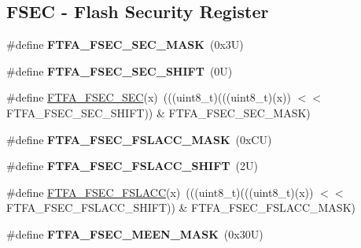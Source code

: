 \subsection*{F\+S\+EC -\/ Flash Security Register}
\begin{DoxyCompactItemize}
\item 
\mbox{\label{group___f_t_f_a___register___masks_ga3f0ba5e4a511479878b0505bc098ec00}} 
\#define {\bfseries F\+T\+F\+A\+\_\+\+F\+S\+E\+C\+\_\+\+S\+E\+C\+\_\+\+M\+A\+SK}~(0x3\+U)
\item 
\mbox{\label{group___f_t_f_a___register___masks_ga0c7032c13efe05ed6c6d86c42beb7a5f}} 
\#define {\bfseries F\+T\+F\+A\+\_\+\+F\+S\+E\+C\+\_\+\+S\+E\+C\+\_\+\+S\+H\+I\+FT}~(0\+U)
\item 
\#define \mbox{\hyperlink{group___f_t_f_a___register___masks_gacb0f50c64228c78ff70896ffa68ec797}{F\+T\+F\+A\+\_\+\+F\+S\+E\+C\+\_\+\+S\+EC}}(x)~(((uint8\+\_\+t)(((uint8\+\_\+t)(x)) $<$$<$ F\+T\+F\+A\+\_\+\+F\+S\+E\+C\+\_\+\+S\+E\+C\+\_\+\+S\+H\+I\+FT)) \& F\+T\+F\+A\+\_\+\+F\+S\+E\+C\+\_\+\+S\+E\+C\+\_\+\+M\+A\+SK)
\item 
\mbox{\label{group___f_t_f_a___register___masks_gac14ea09f287d879b663b0a592c330ec0}} 
\#define {\bfseries F\+T\+F\+A\+\_\+\+F\+S\+E\+C\+\_\+\+F\+S\+L\+A\+C\+C\+\_\+\+M\+A\+SK}~(0x\+C\+U)
\item 
\mbox{\label{group___f_t_f_a___register___masks_ga1cb7f2755cb290524e1dbb662893582c}} 
\#define {\bfseries F\+T\+F\+A\+\_\+\+F\+S\+E\+C\+\_\+\+F\+S\+L\+A\+C\+C\+\_\+\+S\+H\+I\+FT}~(2\+U)
\item 
\#define \mbox{\hyperlink{group___f_t_f_a___register___masks_ga31509f1de74f887b5f7c950b24fe48c0}{F\+T\+F\+A\+\_\+\+F\+S\+E\+C\+\_\+\+F\+S\+L\+A\+CC}}(x)~(((uint8\+\_\+t)(((uint8\+\_\+t)(x)) $<$$<$ F\+T\+F\+A\+\_\+\+F\+S\+E\+C\+\_\+\+F\+S\+L\+A\+C\+C\+\_\+\+S\+H\+I\+FT)) \& F\+T\+F\+A\+\_\+\+F\+S\+E\+C\+\_\+\+F\+S\+L\+A\+C\+C\+\_\+\+M\+A\+SK)
\item 
\mbox{\label{group___f_t_f_a___register___masks_gacb199d6a808af296edd3b6ec6ac66cb8}} 
\#define {\bfseries F\+T\+F\+A\+\_\+\+F\+S\+E\+C\+\_\+\+M\+E\+E\+N\+\_\+\+M\+A\+SK}~(0x30\+U)
\item 

\end{DoxyCompactItemize}
